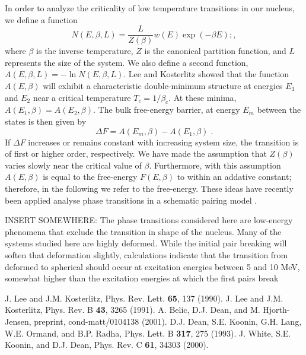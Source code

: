 


\begin{multicols}{2}

In order to analyze the criticality of low temperature
transitions in our nucleus, we define a function 
\begin{equation}
N(E,\beta,L) = \frac{L}{Z(\beta)}w(E)\exp\left(-\beta E\right);,
\end{equation}
where $\beta$ is the inverse temperature, $Z$ is the canonical
partition function, and $L$ represents the size of the system. 
We also define a second function, $A(E,\beta,L)=-\ln N(E,\beta,L)$.
Lee and Kosterlitz showed \cite{lk90,lk91} that the function $A(E,\beta)$ will
exhibit a characteristic double-minimum structure at energies $E_1$ and $E_2$
near a critical temperature $T_c=1/\beta_c$. At these minima, 
$A(E_1,\beta)=A(E_2,\beta)$. The bulk free-energy barrier, at energy $E_m$
between the states is then given by 
\begin{equation}
\Delta F = A(E_m,\beta)-A(E_1,\beta) \;.
\end{equation}
If $\Delta F$ increases or remains constant with increasing
system size, the transition is of first or higher order, respectively. 
We have made the assumption that $Z(\beta)$ varies slowly near the critical
value of $\beta$. Furthermore, with this assumption $A(E,\beta)$ is equal
to the free-energy $F(E,\beta)$ to within an addative constant; therefore,
in the following we refer to the free-energy. 
These ideas have recently been applied analyse phase
transitions in a schematic pairing model \cite{belic01}. 


INSERT SOMEWHERE: 
The phase transitions 
considered here are low-energy phenomena that exclude
the transition in shape of the nucleus. Many of the
systems studied here are highly deformed. While the
initial pair breaking will soften that deformation slightly,
calculations indicate that 
the transition from deformed to spherical should occur at
excitation energies between 5 and 10 MeV, somewhat higher
than the excitation energies at which the first pairs
break \cite{dean93,white00}



\begin{thebibliography}{99}
J. Lee and J.M. Kosterlitz, Phys. Rev. Lett. {\bf 65}, 137 (1990).
J. Lee and J.M. Kosterlitz, Phys. Rev. B {\bf 43}, 3265 (1991).
A. Belic, D.J. Dean, and M. Hjorth-Jensen, preprint, 
cond-matt/0104138 (2001).
D.J. Dean, S.E. Koonin, G.H. Lang, W.E. Ormand, and B.P. Radha, 
Phys. Lett. B {\bf 317}, 275 (1993). 
J. White, S.E. Koonin, and D.J. Dean, Phys. Rev. C {\bf 61}, 34303 (2000).
\end{thebibliography}

\end{multicols}



